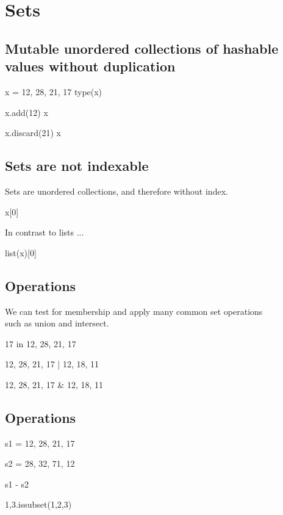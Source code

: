 \documentclass[aspectratio=1610,slidestop]{beamer}
\begin{document}
\section{Sets}
\makeTableOfContentsSection

\subsection{Mutable unordered collections of hashable values without duplication}
\begin{pframe}
\begin{pyconsole}
x = {12, 28, 21, 17}
type(x)

x.add(12)
x

x.discard(21)
x
\end{pyconsole}
\end{pframe}

\subsection{Sets are not indexable}
\begin{pframe}
Sets are unordered collections, and therefore without index.
\begin{pyconsole}
x[0]
\end{pyconsole}
\medskip
\medskip

In contrast to lists ...
\begin{pyconsole}
list(x)[0]
\end{pyconsole}
\end{pframe}


\subsection{Operations}
\begin{pframe}
We can test for membership and apply many common set operations\\
such as union and intersect.
\medskip

\begin{pyconsole}
17 in {12, 28, 21, 17}

{12, 28, 21, 17} | {12, 18, 11}

{12, 28, 21, 17} & {12, 18, 11}
\end{pyconsole}
\end{pframe}


\subsection{Operations}
\begin{pframe}
 \medskip

\begin{pyconsole}
s1 = {12, 28, 21, 17}

s2 = {28, 32, 71, 12}

s1 - s2

{1,3}.issubset({1,2,3})
\end{pyconsole}
\end{pframe}
\end{document}
